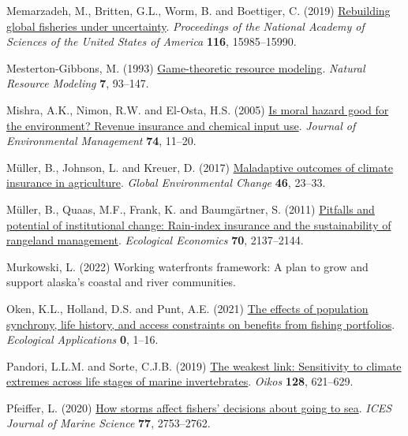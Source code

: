 \documentclass[
  letterpaper,
  DIV=11,
  numbers=noendperiod]{scrartcl}
\newlength{\cslhangindent}
\newlength{\cslentryspacingunit} %
\newenvironment{CSLReferences}[2] %
 {%
  \setlength{\parindent}{0pt}
  \ifodd #1
  \let\oldpar\par
  \def\par{\hangindent=\cslhangindent\oldpar}
  \fi
  \setlength{\parskip}{#2\cslentryspacingunit}
 }%
 {}
\theoremstyle{plain}
\theoremstyle{plain}
\theoremstyle{remark}
\begin{document}
\begin{CSLReferences}{1}{0}
\leavevmode{}%
Memarzadeh, M., Britten, G.L., Worm, B. and Boettiger, C. (2019)
\href{https://doi.org/10.1073/pnas.1902657116}{Rebuilding global
fisheries under uncertainty}. \emph{Proceedings of the National Academy
of Sciences of the United States of America} \textbf{116}, 15985--15990.

\leavevmode{}%
Mesterton-Gibbons, M. (1993)
\href{https://doi.org/10.1111/j.1939-7445.1993.tb00143.x}{Game-theoretic
resource modeling}. \emph{Natural Resource Modeling} \textbf{7},
93--147.

\leavevmode{}%
Mishra, A.K., Nimon, R.W. and El-Osta, H.S. (2005)
\href{https://doi.org/10.1016/j.jenvman.2004.08.003}{Is moral hazard
good for the environment? Revenue insurance and chemical input use}.
\emph{Journal of Environmental Management} \textbf{74}, 11--20.

\leavevmode{}%
Müller, B., Johnson, L. and Kreuer, D. (2017)
\href{https://doi.org/10.1016/j.gloenvcha.2017.06.010}{Maladaptive
outcomes of climate insurance in agriculture}. \emph{Global
Environmental Change} \textbf{46}, 23--33.

\leavevmode{}%
Müller, B., Quaas, M.F., Frank, K. and Baumgärtner, S. (2011)
\href{https://doi.org/10.1016/j.ecolecon.2011.06.011}{Pitfalls and
potential of institutional change: Rain-index insurance and the
sustainability of rangeland management}. \emph{Ecological Economics}
\textbf{70}, 2137--2144.

\leavevmode{}%
Murkowski, L. (2022) Working waterfronts framework: A plan to grow and
support alaska's coastal and river communities.

\leavevmode{}%
Oken, K.L., Holland, D.S. and Punt, A.E. (2021)
\href{https://doi.org/10.1002/eap.2307}{The effects of population
synchrony, life history, and access constraints on benefits from fishing
portfolios}. \emph{Ecological Applications} \textbf{0}, 1--16.

\leavevmode{}%
Pandori, L.L.M. and Sorte, C.J.B. (2019)
\href{https://doi.org/10.1111/oik.05886}{The weakest link: Sensitivity
to climate extremes across life stages of marine invertebrates}.
\emph{Oikos} \textbf{128}, 621--629.

\leavevmode{}%
Pfeiffer, L. (2020) \href{https://doi.org/10.1093/icesjms/fsaa145}{How
storms affect fishers' decisions about going to sea}. \emph{ICES Journal
of Marine Science} \textbf{77}, 2753--2762.


\end{CSLReferences}
\end{document}

